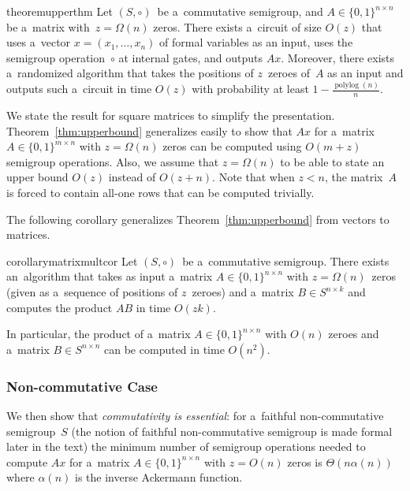 \documentclass[11pt,letterpaper]{article}
\begin{document}
\begin{restatable}{theorem}{upperthm}
\label{thm:upperbound}
Let $(S, \circ)$~be a~commutative semigroup, 
and $A \in \{0,1\}^{n \times n}$ be a~matrix 
with~$z=\Omega(n)$ zeros. 
There exists a~circuit of size $O(z)$ that uses 
a~vector $x = (x_1,\ldots, x_n)$ of formal variables as an input,
uses the semigroup operation~$\circ$ at internal gates,
and outputs $Ax$. Moreover, there exists a~randomized 
algorithm that takes the positions of $z$~zeroes of~$A$
as an input and outputs such a~circuit in time $O(z)$
with probability at least $1-\frac{\operatorname{polylog}(n)}{n}$.
\end{restatable}

We state the result for square matrices to simplify the presentation. Theorem~\ref{thm:upperbound} generalizes easily
to show that $Ax$ for a~matrix $A \in \{0,1\}^{m \times n}$ with $z=\Omega(n)$ zeros can be computed using $O(m+z)$ semigroup operations. Also, 
we assume that $z=\Omega(n)$ to be able to state an upper bound $O(z)$ instead of $O(z+n)$. Note that when
$z<n$, the matrix~$A$ is forced to contain all-one rows
that can be computed trivially.

The following corollary generalizes Theorem~\ref{thm:upperbound}
from vectors to matrices.

\begin{restatable}{corollary}{matrixmultcor}
\label{cor:matrixmultiplication}
Let $(S, \circ)$~be a~commutative semigroup.
There exists an~algorithm that takes as input 
a~matrix $A \in \{0,1\}^{n \times n}$ with 
$z=\Omega(n)$~zeros (given as a~sequence of positions 
of $z$~zeroes)
and a~matrix $B \in S^{n \times k}$ and computes
the product $AB$ in time $O(zk)$.
\end{restatable}
In particular, the product of a~matrix $A \in \{0,1\}^{n \times n}$
with $O(n)$ zeroes and a~matrix $B \in S^{n \times n}$ can be computed in time $O(n^2)$.

\subsubsection{Non-commutative Case}
We then show that \emph{commutativity is essential}: for
a~faithful non-commutative semigroup~$S$
(the notion of faithful non-commutative semigroup  is made formal
later in the text) the minimum number of semigroup operations
needed to compute $Ax$ for a~matrix
$A \in \{0,1\}^{n \times n}$ with $z=O(n)$ zeros is
$\Theta(n\alpha(n))$ where $\alpha(n)$ is the inverse Ackermann function.
\end{document}

